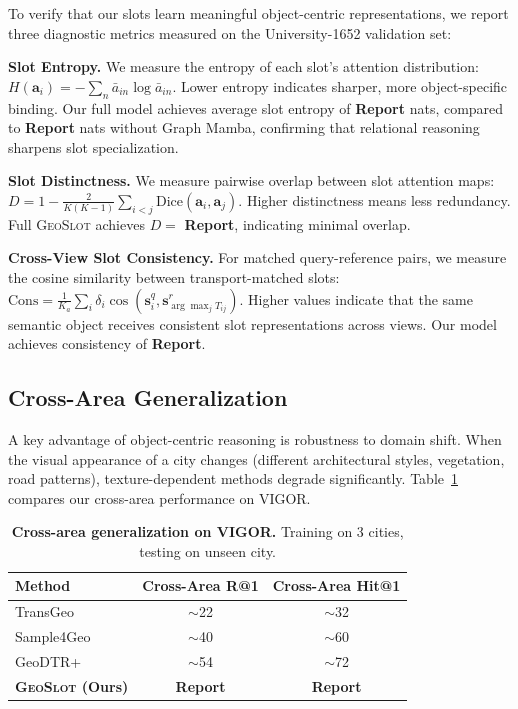 \documentclass{article}
\newcommand{\ours}{\textsc{GeoSlot}}
\begin{document}
To verify that our slots learn meaningful object-centric representations, we report three diagnostic metrics measured on the University-1652 validation set:

\textbf{Slot Entropy.} We measure the entropy of each slot's attention distribution: $H(\mathbf{a}_i) = -\sum_n \bar{a}_{in} \log \bar{a}_{in}$. Lower entropy indicates sharper, more object-specific binding. Our full model achieves average slot entropy of \textbf{Report} nats, compared to \textbf{Report} nats without Graph Mamba, confirming that relational reasoning sharpens slot specialization.

\textbf{Slot Distinctness.} We measure pairwise overlap between slot attention maps: $D = 1 - \frac{2}{K(K-1)} \sum_{i<j} \text{Dice}(\mathbf{a}_i, \mathbf{a}_j)$. Higher distinctness means less redundancy. Full \ours{} achieves $D =$ \textbf{Report}, indicating minimal overlap.

\textbf{Cross-View Slot Consistency.} For matched query-reference pairs, we measure the cosine similarity between transport-matched slots: $\text{Cons} = \frac{1}{K_a} \sum_i \delta_i \cos(\mathbf{s}_i^q, \mathbf{s}_{\arg\max_j T_{ij}}^r)$. Higher values indicate that the same semantic object receives consistent slot representations across views. Our model achieves consistency of \textbf{Report}.

\subsection{Cross-Area Generalization}

A key advantage of object-centric reasoning is robustness to domain shift. When the visual appearance of a city changes (different architectural styles, vegetation, road patterns), texture-dependent methods degrade significantly. Table~\ref{tab:crossarea} compares our cross-area performance on VIGOR.

\begin{table}[h]
\centering
\caption{\textbf{Cross-area generalization on VIGOR.} Training on 3 cities, testing on unseen city.}
\label{tab:crossarea}
\begin{tabular}{lcc}
\toprule
Method & Cross-Area R@1 & Cross-Area Hit@1 \\
\midrule
TransGeo~\cite{transgeo} & $\sim$22 & $\sim$32 \\
Sample4Geo~\cite{sample4geo} & $\sim$40 & $\sim$60 \\
GeoDTR+~\cite{geodtr} & $\sim$54 & $\sim$72 \\
\textbf{\ours{} (Ours)} & \textbf{Report} & \textbf{Report} \\
\bottomrule
\end{tabular}
\end{table}
\end{document}
